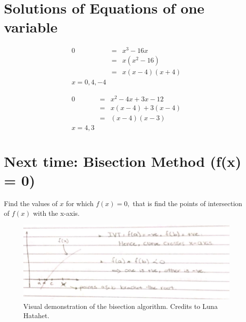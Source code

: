\documentclass[]{article}
\begin{document}
\section*{Solutions of Equations of one variable}

\begin{eqnarray}
	0 &=& x^3 - 16x \nonumber \\
	&=& x(x^2 - 16) \nonumber\\
	&=& x(x-4)(x+4) \nonumber\\
	 x = 0,4,-4 \nonumber
\end{eqnarray}

\begin{eqnarray}
	0 &=&  x^2 - 4x + 3x - 12 \nonumber \\ 
	&=& x(x-4) + 3(x-4) \nonumber \\
	&=& (x-4)(x-3) \nonumber \\
	x = 4,3 \nonumber
\end{eqnarray}

\section*{Next time: Bisection Method (f(x) = 0)}

Find the values of $ x $ for which $ f(x) = 0, $ that is find the points of intersection of $ f(x) $ with the x-axis. 

\begin{figure}
	\centering
	\includegraphics[width=\linewidth]{graph.jpeg}
	\caption{Visual demonstration of the bisection algorithm. Credits to Luna Hatahet. }
	\label{fig:graph}
\end{figure}
\end{document}
